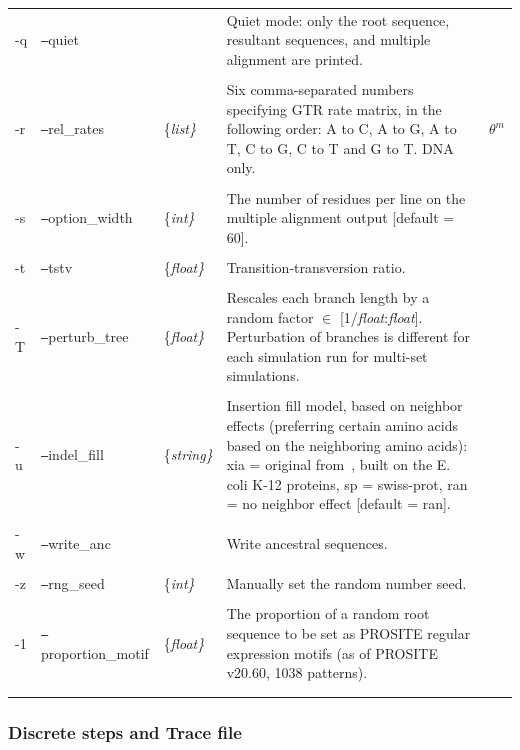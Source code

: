 \documentclass[10pt]{article}
\begin{document}
\begin{ThreePartTable}
\begin{longtable}{p{0.40in}llp{2.75in}p{0.25in}}
\\
 -q & {\tt --}quiet & & Quiet mode: only the root sequence, resultant sequences, and multiple alignment are printed.\\
\\
 -r & {\tt --}rel\_rates & \{\it list\} & Six comma-separated numbers specifying GTR rate matrix, in the following order: A to C, A to G, A to T, C to G, C to T and G to T. DNA only. & $\theta^m$ \tnote{b}\\
\\
 -s & {\tt --}option\_width & \{\it int\} & The number of residues per line on the multiple alignment output [default = 60]. \\
\\
 -t & {\tt --}tstv & \{\it float\} & Transition-transversion ratio. \\
\\
 -T & {\tt --}perturb\_tree & \{\it float\} & Rescales each branch length by a random factor $\in$ [1/{\it float}:{\it float}]. Perturbation of branches is different for each simulation run for multi-set simulations. \\
\\
 -u & {\tt --}indel\_fill & \{\it string\} & Insertion fill model, based on neighbor effects (preferring certain amino acids based on the neighboring amino acids): xia = original from~\cite{Xia02}, built on the E. coli K-12 proteins, sp = swiss-prot, ran = no neighbor effect [default = ran]. \\
\\
 -w & {\tt --}write\_anc & & Write ancestral sequences. \\
\\
 -z & {\tt --}rng\_seed & \{\it int\} & Manually set the random number seed.\\
\\
 -1 & {\tt --}proportion\_motif & \{\it float\} & The proportion of a random root sequence to be set as PROSITE regular expression motifs (as of PROSITE v20.60, 1038 patterns).\\
 \\
 \hline
 \label{tab:global}
 \end{longtable}
\end{ThreePartTable}

\newpage

 \subsubsection{Discrete steps and Trace file}
 \label{sec:trace}
\end{document}

